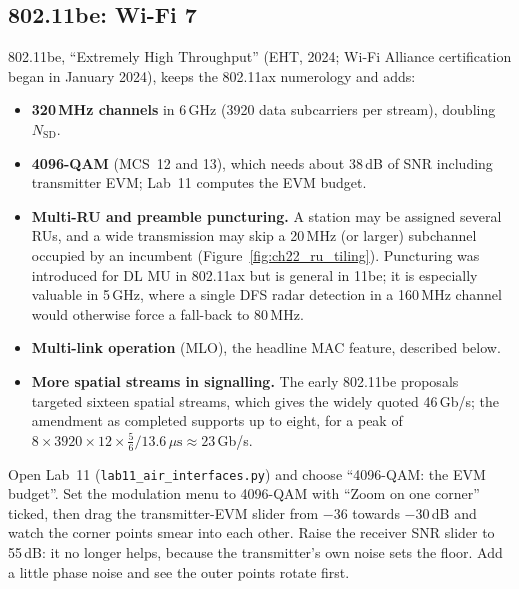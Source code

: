 \subsection{802.11be: Wi-Fi 7}

802.11be, ``Extremely High Throughput'' (EHT, 2024; Wi-Fi Alliance certification began in January
2024), keeps the 802.11ax numerology and adds:
\begin{itemize}
\item \textbf{320\,MHz channels} in 6\,GHz (3920 data subcarriers per stream), doubling
$N_{\text{SD}}$.
\item \textbf{4096-QAM} (MCS~12 and 13), which needs about 38\,dB of SNR including transmitter EVM;
Lab~11 computes the EVM budget.
\item \textbf{Multi-RU and preamble puncturing.} A station may be assigned several RUs, and a wide
transmission may skip a 20\,MHz (or larger) subchannel occupied by an incumbent
(Figure~\ref{fig:ch22_ru_tiling}). Puncturing was introduced for DL MU in 802.11ax but is general in
11be; it is especially valuable in 5\,GHz, where a single DFS radar detection in a 160\,MHz channel
would otherwise force a fall-back to 80\,MHz.
\item \textbf{Multi-link operation} (MLO), the headline MAC feature, described below.
\item \textbf{More spatial streams in signalling.} The early 802.11be proposals targeted sixteen
spatial streams, which gives the widely quoted 46\,Gb/s; the amendment as completed supports up to
eight, for a peak of $8\times3920\times12\times\tfrac56/13.6\,\mu\text{s}\approx23$\,Gb/s.
\end{itemize}


\begin{tryit}
Open Lab~11 (\texttt{lab11\_air\_interfaces.py}) and choose ``4096-QAM: the EVM budget''. Set the
modulation menu to 4096-QAM with ``Zoom on one corner'' ticked, then drag the transmitter-EVM slider
from $-36$ towards $-30$\,dB and watch the corner points smear into each other. Raise the receiver
SNR slider to 55\,dB: it no longer helps, because the transmitter's own noise sets the floor. Add a
little phase noise and see the outer points rotate first.
\end{tryit}

